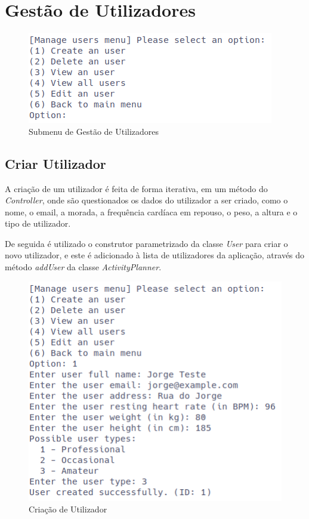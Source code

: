 \documentclass[a4paper,12pt]{scrreprt}
\begin{document}
\section{Gestão de Utilizadores}
    \label{sec:gestao-utlizadores}
    \begin{figure}[!ht]
        \centering
        \includegraphics[width=\textwidth]{images/manageUsersSubMenu.png}
        \caption{Submenu de Gestão de Utilizadores}
        \label{fig:submenu-users}
    \end{figure}

    \clearpage
    \subsection{Criar Utilizador}
    A criação de um utilizador é feita de forma iterativa, em um método do \textit{Controller},
    onde são questionados os dados do utilizador a ser criado,
    como o nome, o email, a morada, a frequência cardíaca em repouso, o peso, a altura e o tipo de utilizador.

    De seguida é utilizado o construtor parametrizado da classe \textit{User} para criar o novo utilizador,
    e este é adicionado à lista de utilizadores da aplicação,
    através do método \textit{addUser} da classe \textit{ActivityPlanner}.

    \begin{figure}[!ht]
        \centering
        \includegraphics[width=\textwidth]{images/createUser.png}
        \caption{Criação de Utilizador}
        \label{fig:create-user}
    \end{figure}
\end{document}
